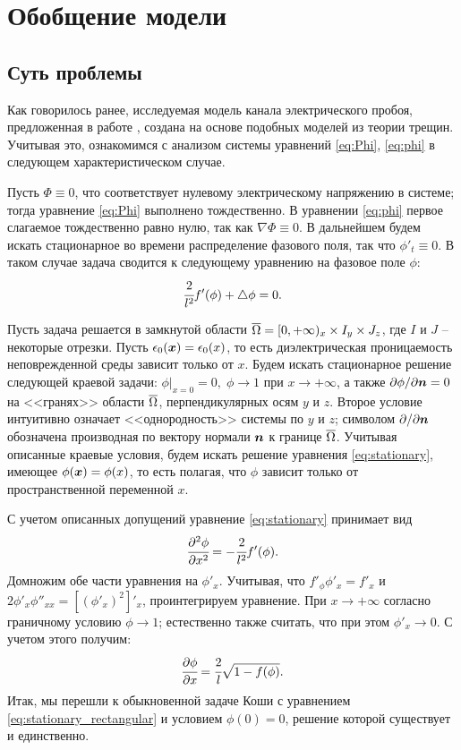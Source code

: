 
\section{Обобщение модели}

\subsection{Суть проблемы}
\label{ssec:matter_of_problem}

Как говорилось ранее, исследуемая модель канала электрического пробоя, предложенная в работе \cite{pitike_dielectric_breakdown}, создана на основе подобных моделей из теории трещин. Учитывая это, ознакомимся с анализом системы уравнений \eqref{eq:Phi}, \eqref{eq:phi} в следующем характеристическом случае.

Пусть $\Phi \equiv 0$, что соответствует нулевому электрическому напряжению в системе; тогда уравнение \eqref{eq:Phi} выполнено тождественно. В уравнении \eqref{eq:phi} первое слагаемое тождественно равно нулю, так как $\nabla \Phi \equiv 0$. В дальнейшем будем искать стационарное во времени распределение фазового поля, так что $\phi'_t \equiv 0$. В таком случае задача сводится к следующему уравнению на фазовое поле $\phi$:
\begin{equation}
	\cfrac{2}{l^2} f'(\phi) + \triangle \phi = 0 {\text{.}}
	\label{eq:stationary}
\end{equation}

Пусть задача решается в замкнутой области ${\overline{\Omega}} = [0, +\infty)_x \times I_y \times J_z$, где $I$ и $J$ -- некоторые отрезки. Пусть $\epsilon_0({\boldsymbol{x}}) = \epsilon_0(x)$, то есть диэлектрическая проницаемость неповрежденной среды зависит только от $x$. Будем искать стационарное решение следующей краевой задачи: $\phi|_{x = 0} = 0, \; \phi \to 1$ при $x \to +\infty$, а также $\partial \phi / \partial {\boldsymbol{n}} = 0$ на <<гранях>> области ${\overline{\Omega}}$, перпендикулярных осям $y$ и $z$. Второе условие интуитивно означает <<однородность>> системы по $y$ и $z$; символом $\partial  / \partial {\boldsymbol{n}}$ обозначена производная по вектору нормали ${\boldsymbol{n}}$ к границе ${\overline{\Omega}}$. Учитывая описанные краевые условия, будем искать решение уравнения \eqref{eq:stationary}, имеющее $\phi({\boldsymbol{x}}) = \phi(x)$, то есть полагая, что $\phi$ зависит только от пространственной переменной $x$.

С учетом описанных допущений уравнение \eqref{eq:stationary} принимает вид
$$\cfrac{\partial^2 \phi}{\partial {x}^2} = -\cfrac{2}{l^2} f'(\phi) {\text{.}}$$
Домножим обе части уравнения на $\phi'_x$. Учитывая, что $f'_\phi \phi'_x = f'_x$ и $2 \phi'_x \phi''_{xx} = [(\phi'_x)^2]'_x$, проинтегрируем уравнение. При $x \to +\infty$ согласно граничному условию $\phi \to 1$; естественно также считать, что при этом $\phi'_x \to 0$. С учетом этого получим:
\begin{equation}
	\cfrac{\partial \phi}{\partial x} = \cfrac{2}{l} \sqrt{1 - f(\phi)} {\text{.}}
	\label{eq:stationary_rectangular}
\end{equation}
Итак, мы перешли к обыкновенной задаче Коши с уравнением \eqref{eq:stationary_rectangular} и условием $\phi(0) = 0$, решение которой существует и единственно.

